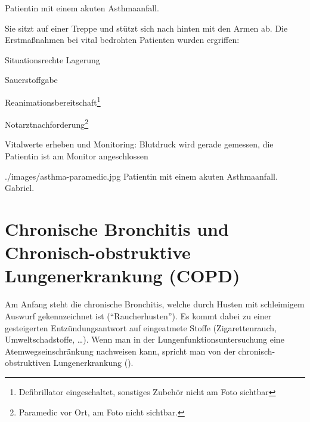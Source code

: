 {%
Patientin mit einem akuten Asthmaanfall.

Sie sitzt auf einer Treppe und stützt sich nach hinten mit
den Armen ab. Die Erstmaßnahmen bei vital bedrohten
Patienten wurden ergriffen:
\begin{compactitem}
  \item Situationsrechte Lagerung
  \item Sauerstoffgabe
  \item Reanimationsbereitschaft\footnote{Defibrillator eingeschaltet,
  sonstiges Zubehör nicht am Foto sichtbar}
  \item Notarztnachforderung\footnote{Paramedic
  vor Ort, am Foto nicht sichtbar.}
  \item Vitalwerte erheben und Monitoring:
  Blutdruck wird gerade gemessen, die Patientin
  ist am Monitor angeschlossen
\end{compactitem}
}{

}
{./images/asthma-paramedic.jpg}
{Patientin mit einem akuten Asthmaanfall.\label{fig:asthma-paramedic}}
{Gabriel.}





\section{Chronische Bronchitis und 
Chronisch-obstruktive Lungenerkrankung
(COPD)}
\label{topic:copd}
\nocite{Renz-Polster2006} 


\HeadingSub{}


Am Anfang steht die chronische Bronchitis, welche durch
Husten mit schleimigem Auswurf gekennzeichnet ist
(\enquote{Raucherhusten}). Es kommt dabei zu einer gesteigerten
Entzündungsantwort auf eingeatmete Stoffe (Zigarettenrauch,
Umweltschadstoffe, \ldots). Wenn man in der
Lungenfunktionsuntersuchung eine Atemwegseinschränkung
nachweisen kann, spricht man von der chronisch-obstruktiven
Lungenerkrankung (). 


